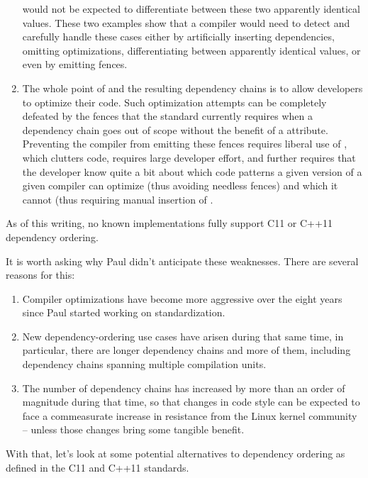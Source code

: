 \documentclass[letterpaper,twocolumn,10pt]{article}
\begin{document}
\begin{enumerate}
	would not be expected to differentiate between these two
	apparently identical values.
	These two examples show that a compiler would need to detect
	and carefully handle these cases either by artificially inserting
	dependencies, omitting optimizations, differentiating between
	apparently identical values, or even by emitting
	 fences.
\item	The whole point of  and the resulting
	dependency chains is to allow developers to optimize their code.
	Such optimization attempts can be completely defeated by
	the  fences that the standard currently
	requires when a dependency chain goes out of scope without
	the benefit of a  attribute.
	Preventing the compiler from emitting these fences requires
	liberal use of , which clutters code,
	requires large developer effort, and further requires that
	the developer know quite a bit about which code patterns a
	given version of a given compiler can optimize (thus avoiding
	needless fences) and which it cannot (thus requiring manual
	insertion of .
\end{enumerate}

As of this writing, no known implementations fully support
C11 or C++11 dependency ordering.

It is worth asking why Paul didn't anticipate these weaknesses.
There are several reasons for this:

\begin{enumerate}
\item	Compiler optimizations have become more aggressive over the
	eight years since Paul started working on standardization.
\item	New dependency-ordering use cases have arisen during that
	same time, in particular, there are longer dependency chains
	and more of them, including dependency chains spanning
	multiple compilation units.
\item	The number of dependency chains has increased by more than
	an order of magnitude during that time, so that changes
	in code style can be expected to face a commeasurate increase
	in resistance from the Linux kernel community -- unless those
	changes bring some tangible benefit.
\end{enumerate}

With that, let's look at some potential alternatives to
dependency ordering as defined in the C11 and C++11 standards.
\end{document}
